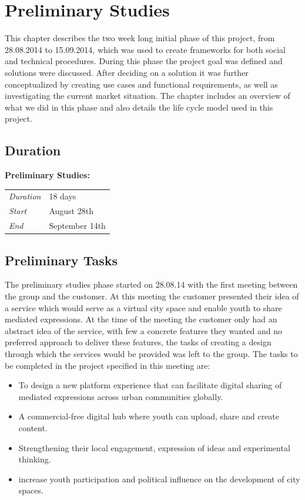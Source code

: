 \chapter{Preliminary Studies}
\label{chap:Prelim}

This chapter describes the two week long initial phase of this project, from 28.08.2014 to 15.09.2014, which was used to create frameworks for both social and technical procedures. During this phase the project goal was defined and solutions were discussed. After deciding on a solution it was further conceptualized by creating use cases and functional requirements, as well as investigating the current market situation. The chapter includes an overview of what we did in this phase and also details the life cycle model used in this project.

\section{Duration}

\begin{minipage}{\linewidth}
\centering
\setlength{\tabcolsep}{22pt}
\textbf{Preliminary Studies:} \\ 
\smallskip
{}
\begin{tabular}{ |l l| }
	\hline
	\it{Duration} & 18 days \\
	\it{Start} & August 28th \\
	\it{End} & September 14th \\
	\hline
\end{tabular}
\end{minipage}

\section{Preliminary Tasks}
\label{sec:PrelimWork}
The preliminary studies phase started on 28.08.14 with the first meeting between the group and the customer. At this meeting the customer presented their idea of a service which would serve as a virtual city space and enable youth to share mediated expressions. At the time of the meeting the customer only had an abstract idea of the service, with few a concrete features they wanted and no preferred approach to deliver these features, the tasks of creating a design through which the services would be provided was left to the group. The tasks to be completed in the project specified in this meeting are:
\begin{itemize}
  \item To design a new platform experience that can facilitate digital sharing of mediated expressions across urban communities globally.
  \item A commercial-free digital hub where youth can upload, share and create content.
  \item Strengthening their local engagement, expression of ideas and experimental thinking.
  \item increase youth participation and political influence on the development of city spaces.
\end{itemize}

